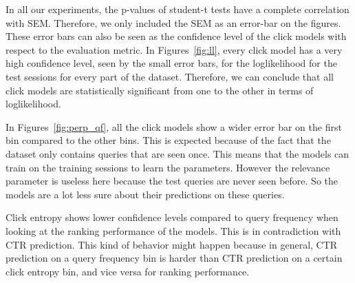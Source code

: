 In all our experiments, the p-values of student-t tests have a complete correlation with SEM.
Therefore, we only included the SEM as an error-bar on the figures. These error bars can also be seen as the confidence level of the click models with respect to the evaluation metric. In Figures~\ref{fig:ll}, every click model has a very high confidence level, seen by the small error bars, for the loglikelihood for the test sessions for every part of the dataset. Therefore, we can conclude that all click models are statistically significant from one to the other in terms of loglikelihood.

In Figures~\ref{fig:perp_qf}, all the click models show a wider error bar on the first bin compared to the other bins. This is expected because of the fact that the dataset only contains queries that are seen once. This means that the models can train on the training sessions to learn the parameters. However the relevance parameter is useless here because the test queries are never seen before. So the models are a lot less sure about their predictions on these queries.

Click entropy shows lower confidence levels compared to query frequency when looking at the ranking performance of the models. This is in contradiction with CTR prediction. This kind of behavior might happen because in general, CTR prediction on a query frequency bin is harder than CTR prediction on a certain click entropy bin, and vice versa for ranking performance.
